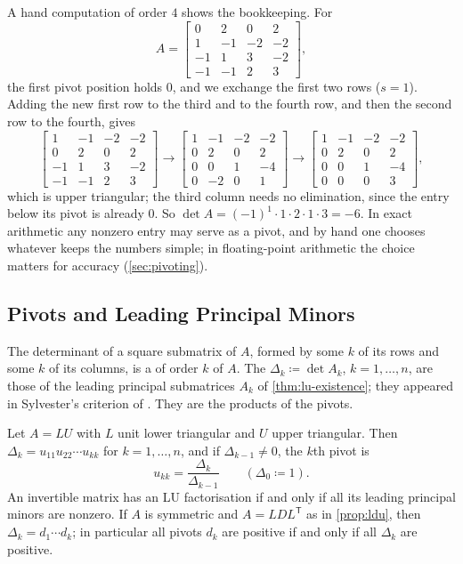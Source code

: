 A hand computation of order $4$ shows the bookkeeping. For
\[
A=\begin{bmatrix}0&2&0&2\\1&-1&-2&-2\\-1&1&3&-2\\-1&-1&2&3\end{bmatrix},
\]
the first pivot position holds $0$, and we exchange the first two rows ($s=1$). Adding the new first row to the third and to the fourth row, and then the second row to the fourth, gives
\[
\begin{bmatrix}1&-1&-2&-2\\0&2&0&2\\-1&1&3&-2\\-1&-1&2&3\end{bmatrix}\longrightarrow\begin{bmatrix}1&-1&-2&-2\\0&2&0&2\\0&0&1&-4\\0&-2&0&1\end{bmatrix}\longrightarrow\begin{bmatrix}1&-1&-2&-2\\0&2&0&2\\0&0&1&-4\\0&0&0&3\end{bmatrix},
\]
which is upper triangular; the third column needs no elimination, since the entry below its pivot is already $0$. So $\det A=(-1)^1\cdot1\cdot2\cdot1\cdot3=-6$. In exact arithmetic any nonzero entry may serve as a pivot, and by hand one chooses whatever keeps the numbers simple; in floating-point arithmetic the choice matters for accuracy (\cref{sec:pivoting}).

\subsection{Pivots and Leading Principal Minors}

The determinant of a square submatrix of $A$, formed by some $k$ of its rows and some $k$ of its columns, is a  of order $k$ of $A$. The  $\Delta_k\coloneqq\det A_k$, $k=1,\ldots,n$, are those of the leading principal submatrices $A_k$ of \cref{thm:lu-existence}; they appeared in Sylvester's criterion of . They are the products of the pivots.

\begin{proposition}
\label{prop:pivots-minors}
Let $A=LU$ with $L$ unit lower triangular and $U$ upper triangular. Then $\Delta_k=u_{11}u_{22}\cdots u_{kk}$ for $k=1,\ldots,n$, and if $\Delta_{k-1}\ne0$, the $k$th pivot is
\[
u_{kk}=\frac{\Delta_k}{\Delta_{k-1}}\qquad(\Delta_0\coloneqq1).
\]
An invertible matrix has an LU factorisation if and only if all its leading principal minors are nonzero. If $A$ is symmetric and $A=LDL^{\mathsf T}$ as in \cref{prop:ldu}, then $\Delta_k=d_1\cdots d_k$; in particular all pivots $d_k$ are positive if and only if all $\Delta_k$ are positive.
\end{proposition}

